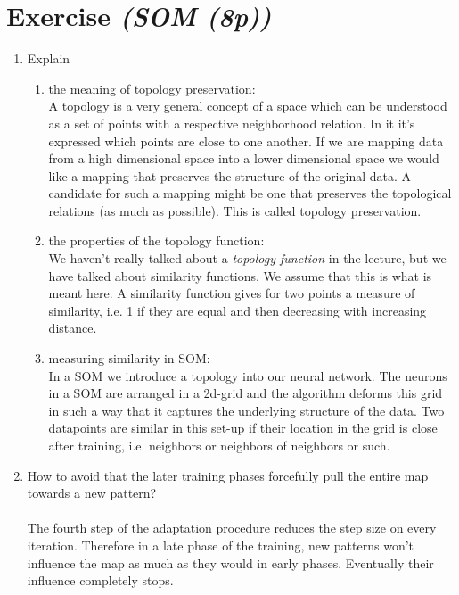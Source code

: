 \documentclass{article}
\begin{document}
\section{Exercise \textit{(SOM (8p))}}
\begin{enumerate}
    \item Explain\\
        \begin{enumerate}
            \item the meaning of topology preservation: \\
             A topology is a very general concept of a space which can be understood as a set of points with a respective neighborhood relation. In it it's expressed which points are close to one another. If we are mapping data from a high dimensional space into a lower dimensional space we would like a mapping that preserves the structure of the original data. A candidate for such a mapping might be one that preserves the topological relations (as much as possible). This is called topology preservation.
            \item the properties of the topology function: \\
            We haven't really talked about a \textit{topology function} in the lecture, but we have talked about similarity functions. We assume that this is what is meant here. A similarity function gives for two points a measure of similarity, i.e. 1 if they are equal and then decreasing with increasing distance.
            \item measuring similarity in SOM:\\
            In a SOM we introduce a topology into our neural network. The neurons in a SOM are arranged in a 2d-grid and the algorithm deforms this grid in such a way that it captures the underlying structure of the data. Two datapoints are similar in this set-up if their location in the grid is close after training, i.e. neighbors or neighbors of neighbors or such.
        \end{enumerate}
    \item How to avoid that the later training phases forcefully pull the entire
        map towards a new pattern?\\
        \\
        The fourth step of the adaptation procedure reduces the step size on every iteration. Therefore in a late phase of the training, new patterns won't influence the map as much as they would in early phases. Eventually their influence completely stops. \\

\end{enumerate}
\end{document}
